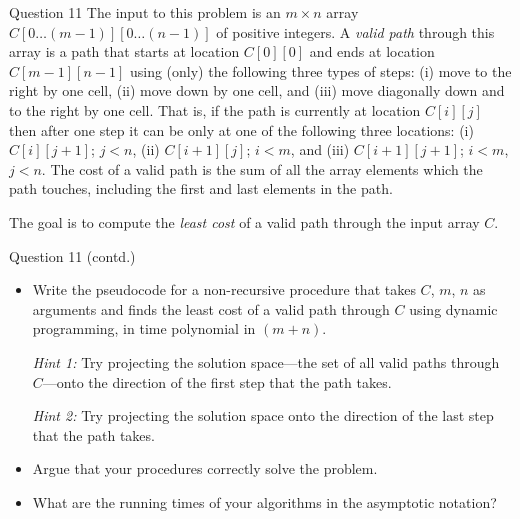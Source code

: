 \documentclass{beamer}
\begin{document}
\begin{frame}{}
\end{frame}
\begin{frame}{}
\end{frame}

\begin{frame}{Question 11}
The input to this problem is an $m \times n$ array $C[0\ldots(m-1)][0\ldots(n-1)]$ of positive integers. A \emph{valid path} through this array is a path that starts at location $C[0][0]$ and ends at location $C[m-1][n-1]$ using (only) the following three types of steps: (i) move to the right by one cell, (ii) move down by one cell, and (iii) move diagonally down and to the right by one cell. That is, if the path is currently at location $C[i][j]$ then after one step it can be only at one of the following three locations: (i) $C[i][j+1]$; $j < n$, (ii) $C[i+1][j]$; $i < m$, and (iii) $C[i+1][j+1]$; $i < m$, $j < n$. The cost of a valid path is the sum of all the array elements which the path touches, including the first and last elements in the path.

\medskip
The goal is to compute the \emph{least cost} of a valid path through the input array $C$.
\end{frame}

\begin{frame}{Question 11 (contd.)}
\begin{itemize}
  \item[(a)] Write the pseudocode for a non-recursive procedure that takes $C$, $m$, $n$ as arguments and finds the least cost of a valid path through $C$ using dynamic programming, in time polynomial in $(m+n)$.

  \textit{Hint 1:} Try projecting the solution space---the set of all valid paths through $C$---onto the direction of the first step that the path takes.

  \textit{Hint 2:} Try projecting the solution space onto the direction of the last step that the path takes.

  \item[(b)] Argue that your procedures correctly solve the problem.

  \item[(c)] What are the running times of your algorithms in the asymptotic notation?
\end{itemize}
\end{frame}

\begin{frame}{}
\end{frame}
\begin{frame}{}
\end{frame}
\end{document}
